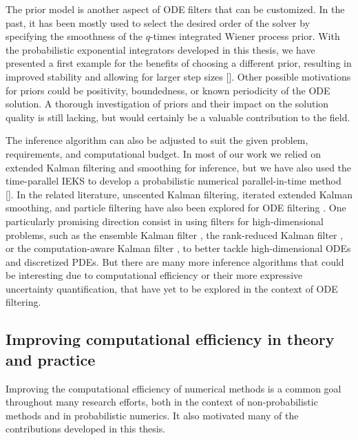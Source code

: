 \documentclass{mimosis}
\begin{document}
The prior model is another aspect of ODE filters that can be customized.
In the past, it has been mostly used to select the desired order of the solver by specifying the smoothness of the \(q\)-times integrated Wiener process prior.
With the probabilistic exponential integrators developed in this thesis, we have presented a first example for the benefits of choosing a different prior,
resulting in improved stability and allowing for larger step sizes
{[}\sprobexpint{}].
Other possible motivations for priors could be positivity, boundedness, or known periodicity of the ODE solution.
A thorough investigation of priors and their impact on the solution quality is still lacking, but would certainly be a valuable contribution to the field.

The inference algorithm can also be adjusted to suit the given problem, requirements, and computational budget.
In most of our work we relied on extended Kalman filtering and smoothing for inference, but we have also used the time-parallel IEKS to develop a probabilistic numerical parallel-in-time method
{[}\spint{}].
In the related literature, unscented Kalman filtering, iterated extended Kalman smoothing, and particle filtering have also been explored for ODE filtering
\parencite{kersting16,tronarp18_probab_solut_to_ordin_differ,tronarp20_bayes_ode_solver,tronarp20_bayes_ode_solver,kramer2024implementing}.
One particularly promising direction consist in using filters for high-dimensional problems,
such as the ensemble Kalman filter
\parencite{evensen1994sequential},
the rank-reduced Kalman filter
\parencite{schmidt2023rankreduced},
or the
computation-aware Kalman filter
\parencite{pförtner2024cakf},
to better tackle high-dimensional ODEs and discretized PDEs.
But there are many more inference algorithms that could be interesting due to computational efficiency or their more expressive uncertainty quantification, that have yet to be explored in the context of ODE filtering.
\subsection{Improving computational efficiency in theory and practice}
\label{sec:orgf34516d}
Improving the computational efficiency of numerical methods is a common goal throughout many research efforts, both in the context of non-probabilistic methods and in probabilistic numerics.
It also motivated many of the contributions developed in this thesis.
\end{document}
